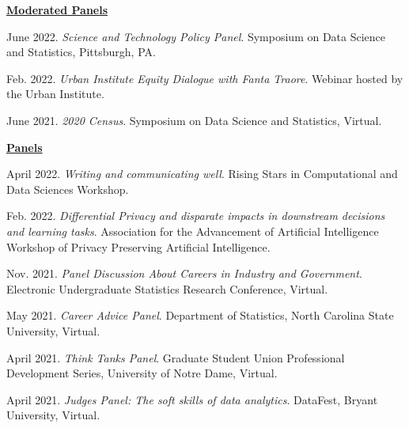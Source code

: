 \documentclass[11pt, letterpaper, roman]{moderncv} %
\begin{document}
\begin{etaremune}[topsep=0pt, itemsep=2pt, partopsep=0pt, parsep=0pt]
\vspace{6pt}
\hspace{-0.30in}\underline{\textbf{\large Moderated Panels}}\normalsize
    \item June 2022. \textit{Science and Technology Policy Panel}. Symposium on Data Science and Statistics, Pittsburgh, PA.
    
    \item Feb. 2022. \textit{Urban Institute Equity Dialogue with Fanta Traore}. Webinar hosted by the Urban Institute.
    
    \item June 2021. \textit{2020 Census}. Symposium on Data Science and Statistics, Virtual.
    
    \vspace{6pt}
\hspace{-0.30in}\underline{\textbf{\large Panels}}\normalsize
    \item April 2022. \textit{Writing and communicating well}. Rising Stars in Computational and Data Sciences Workshop.

    \item Feb. 2022. \textit{Differential Privacy and disparate impacts in downstream decisions and learning tasks}. Association for the Advancement of Artificial Intelligence Workshop of Privacy Preserving Artificial Intelligence.
    
    \item Nov. 2021. \textit{Panel Discussion About Careers in Industry and Government}. Electronic Undergraduate Statistics Research Conference, Virtual.

    \item May 2021. \textit{Career Advice Panel}. Department of Statistics, North Carolina State University, Virtual.
    
    \item April 2021. \textit{Think Tanks Panel}. Graduate Student Union Professional Development Series, University of Notre Dame, Virtual.
    
    \item April 2021. \textit{Judges Panel: The soft skills of data analytics}. DataFest, Bryant University, Virtual.
\end{etaremune}

\vspace{-10pt}
\end{document}
